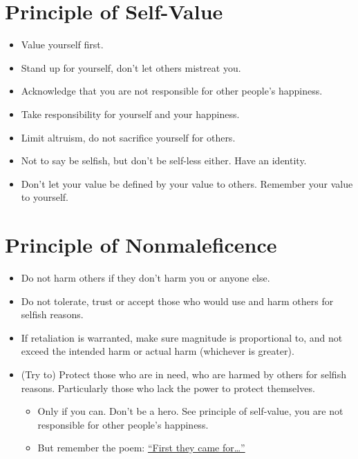 \documentclass[
]{book}
\providecommand{\tightlist}{%
  \setlength{\itemsep}{0pt}\setlength{\parskip}{0pt}}
\begin{document}
\hypertarget{principle-of-self-value}{%
\section{Principle of Self-Value}\label{principle-of-self-value}}

\begin{itemize}
\tightlist
\item
  Value yourself first.
\item
  Stand up for yourself, don't let others mistreat you.
\item
  Acknowledge that you are not responsible for other people's happiness.
\item
  Take responsibility for yourself and your happiness.
\item
  Limit altruism, do not sacrifice yourself for others.
\item
  Not to say be selfish, but don't be self-less either. Have an identity.
\item
  Don't let your value be defined by your value to others. Remember your value to yourself.
\end{itemize}

\hypertarget{principle-of-nonmaleficence}{%
\section{Principle of Nonmaleficence}\label{principle-of-nonmaleficence}}

\begin{itemize}
\tightlist
\item
  Do not harm others if they don't harm you or anyone else.
\item
  Do not tolerate, trust or accept those who would use and harm others for selfish reasons.
\item
  If retaliation is warranted, make sure magnitude is proportional to, and not exceed the intended harm or actual harm (whichever is greater).
\item
  (Try to) Protect those who are in need, who are harmed by others for selfish reasons. Particularly those who lack the power to protect themselves.

  \begin{itemize}
  \tightlist
  \item
    Only if you can. Don't be a hero. See principle of self-value, you are not responsible for other people's happiness.
  \item
    But remember the poem: \href{https://en.wikipedia.org/wiki/First_they_came_...}{``First they came for\ldots{}''}
  \end{itemize}
\end{itemize}
\end{document}
